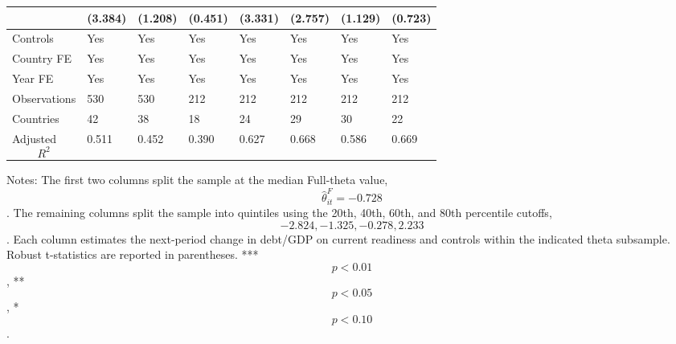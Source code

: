 \begin{table}[H]
\begin{threeparttable}
\begin{tabularx}{\textwidth}{lYYYYYYY}
  & (3.384) & (1.208) & (0.451) & (3.331) & (2.757) & (1.129) & (0.723) \\
\midrule
Controls & Yes & Yes & Yes & Yes & Yes & Yes & Yes \\
Country FE & Yes & Yes & Yes & Yes & Yes & Yes & Yes \\
Year FE & Yes & Yes & Yes & Yes & Yes & Yes & Yes \\
Observations & 530 & 530 & 212 & 212 & 212 & 212 & 212 \\
Countries & 42 & 38 & 18 & 24 & 29 & 30 & 22 \\
Adjusted $$R^2$$ & 0.511 & 0.452 & 0.390 & 0.627 & 0.668 & 0.586 & 0.669 \\
\bottomrule
\end{tabularx}
\begin{tablenotes}[flushleft]\footnotesize
\item Notes: The first two columns split the sample at the median Full-theta value, $$\widehat{\theta}^{F}_{it}=-0.728$$. The remaining columns split the sample into quintiles using the 20th, 40th, 60th, and 80th percentile cutoffs, $$-2.824, -1.325, -0.278, 2.233$$. Each column estimates the next-period change in debt/GDP on current readiness and controls within the indicated theta subsample. Robust t-statistics are reported in parentheses. *** $$p<0.01$$, ** $$p<0.05$$, * $$p<0.10$$.
\end{tablenotes}
\end{threeparttable}
\end{table}
